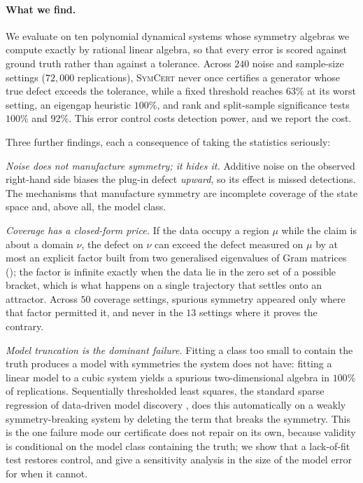 \paragraph{What we find.} We evaluate on ten polynomial dynamical systems
whose symmetry algebras we compute exactly by rational linear algebra, so that
every error is scored against ground truth rather than against a tolerance.
Across $240$ noise and sample-size settings ($72{,}000$ replications),
\textsc{SymCert} never once certifies a generator whose true defect exceeds
the tolerance, while a fixed threshold reaches $63\%$ at its worst setting, an
eigengap heuristic $100\%$, and rank and split-sample significance tests
$100\%$ and $92\%$. This error control costs detection power, and we report
the cost.

Three further findings, each a consequence of taking the statistics seriously:

\emph{Noise does not manufacture symmetry; it hides it.} Additive noise on the
observed right-hand side biases the plug-in defect \emph{upward}, so its
effect is missed detections. The mechanisms that manufacture symmetry are
incomplete coverage of the state space and, above all, the model class.

\emph{Coverage has a closed-form price.} If the data occupy a region $\mu$
while the claim is about a domain $\nu$, the defect on $\nu$ can exceed the
defect measured on $\mu$ by at most an explicit factor built from two
generalised eigenvalues of Gram matrices (); the factor is
infinite exactly when the data lie in the zero set of a possible bracket,
which is what happens on a single trajectory that settles onto an attractor.
Across $50$ coverage settings, spurious symmetry appeared only where that
factor permitted it, and never in the $13$ settings where it proves the
contrary.

\emph{Model truncation is the dominant failure.} Fitting a class too small to
contain the truth produces a model with symmetries the system does not have:
fitting a linear model to a cubic system yields a spurious two-dimensional
algebra in $100\%$ of replications. Sequentially thresholded least squares,
the standard sparse regression of data-driven model discovery
\citep{brunton2016discovering}, does this automatically on a weakly
symmetry-breaking system by deleting the term that breaks the symmetry. This
is the one failure mode our certificate does not repair on its own, because
validity is conditional on the model class containing the truth; we show that
a lack-of-fit test restores control, and give a sensitivity analysis in the
size of the model error for when it cannot.

